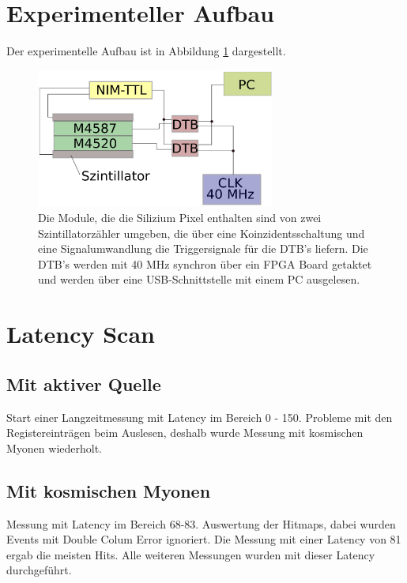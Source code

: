 \documentclass[usenames,dvipsnames]{include/protokollclass}
\begin{document}
	\section{Experimenteller Aufbau}
	Der experimentelle Aufbau ist in Abbildung \ref{fig:aufbau} dargestellt.
	\begin{figure}
		\centering
		\includegraphics[width=0.7\textwidth]{fig/aufbau.eps}
		\caption{Die Module, die die Silizium Pixel enthalten sind von zwei Szintillatorzähler umgeben, die über eine Koinzidentsschaltung und eine Signalumwandlung die Triggersignale für die DTB's liefern. Die DTB's werden mit 40 MHz synchron über ein FPGA Board getaktet und werden über eine USB-Schnittstelle mit einem PC ausgelesen.}
		\label{fig:aufbau}
	\end{figure}

	\section{Latency Scan}
	\subsection{Mit aktiver Quelle}
	Start einer Langzeitmessung mit Latency im Bereich 0 - 150. 
	Probleme mit den Registereinträgen beim Auslesen, deshalb wurde Messung mit kosmischen Myonen wiederholt. 
	\subsection{Mit kosmischen Myonen}
	Messung mit Latency im Bereich 68-83. Auswertung der Hitmaps, dabei wurden Events mit Double Colum Error ignoriert. Die Messung mit einer Latency von 81 ergab die meisten Hits. Alle weiteren Messungen wurden mit dieser Latency durchgeführt.
	
\end{document}
